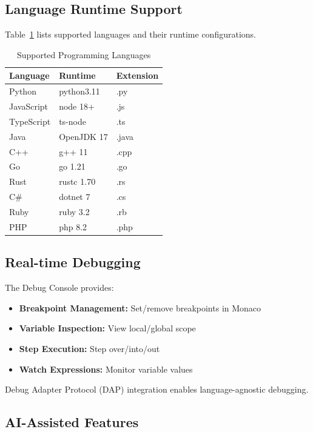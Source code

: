 \documentclass[conference]{IEEEtran}
\begin{document}
\subsection{Language Runtime Support}

Table~\ref{tab:languages} lists supported languages and their runtime configurations.

\begin{table}[htbp]
\caption{Supported Programming Languages}
\begin{center}
\begin{tabularx}{\linewidth}{|l|X|l|}
\hline
\textbf{Language} & \textbf{Runtime} & \textbf{Extension} \\
\hline
Python & python3.11 & .py \\
JavaScript & node 18+ & .js \\
TypeScript & ts-node & .ts \\
Java & OpenJDK 17 & .java \\
C++ & g++ 11 & .cpp \\
Go & go 1.21 & .go \\
Rust & rustc 1.70 & .rs \\
C\# & dotnet 7 & .cs \\
Ruby & ruby 3.2 & .rb \\
PHP & php 8.2 & .php \\
\hline
\end{tabularx}
\label{tab:languages}
\end{center}
\end{table}

\subsection{Real-time Debugging}

The Debug Console provides:
\begin{itemize}
    \item \textbf{Breakpoint Management:} Set/remove breakpoints in Monaco
    \item \textbf{Variable Inspection:} View local/global scope
    \item \textbf{Step Execution:} Step over/into/out
    \item \textbf{Watch Expressions:} Monitor variable values
\end{itemize}

Debug Adapter Protocol (DAP) integration enables language-agnostic debugging.

\subsection{AI-Assisted Features}
\end{document}
